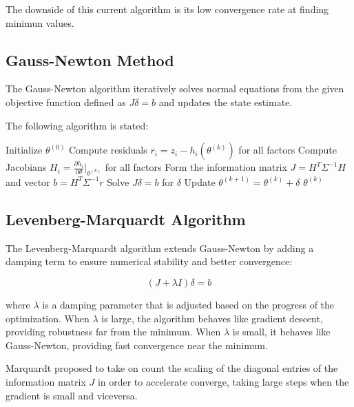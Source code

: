 \documentclass[journal]{IEEEtran}
\begin{document}
The downside of this current algorithm is its low convergence rate at finding minimun values. 


\subsection{Gauss-Newton Method}
The Gauss-Newton algorithm iteratively solves normal equations from the given objective function defined as $J \delta = b$ and updates the state estimate.

The following algorithm is stated:

\begin{algorithm}[H]
\caption{Gauss-Newton for SLAM}
    \begin{algorithmic}[1]
    \STATE Initialize $\theta^{(0)}$
        \STATE Compute residuals $r_i = z_i - h_i(\theta^{(k)})$ for all factors
        \STATE Compute Jacobians $H_i = \frac{\partial h_i}{\partial \theta}|_{\theta^{(k)}}$ for all factors
        \STATE Form the information matrix $J = H^T \Sigma^{-1} H$ and vector $b = H^T \Sigma^{-1} r$
        \STATE Solve $J \delta = b$ for $\delta$
        \STATE Update $\theta^{(k+1)} = \theta^{(k)} + \delta$
    \ENDFOR
    \RETURN $\theta^{(k)}$
    \end{algorithmic}
\end{algorithm}

\subsection{Levenberg-Marquardt Algorithm}

The Levenberg-Marquardt algorithm extends Gauss-Newton by adding a damping term to ensure numerical stability and better convergence:

\begin{equation}
    (J + \lambda I) \delta = b
\end{equation}

where $\lambda$ is a damping parameter that is adjusted based on the progress of the optimization. When $\lambda$ is large, the algorithm behaves like gradient descent, providing robustness far from the minimum. When $\lambda$ is small, it behaves like Gauss-Newton, providing fast convergence near the minimum.

Marquardt proposed to take on count the scaling of the diagonal entries of the information matrix $J$ in order to accelerate converge, taking large steps when the gradient is small and viceversa. 
\end{document}
